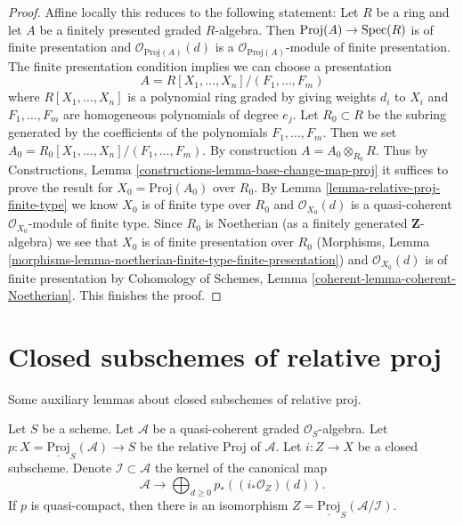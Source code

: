 \begin{proof}
Affine locally this reduces to the following statement:
Let $R$ be a ring and let $A$ be a finitely presented graded $R$-algebra.
Then $\text{Proj}(A) \to \mathop{\mathrm{Spec}}(R)$ is of finite presentation
and $\mathcal{O}_{\text{Proj}(A)}(d)$ is a
$\mathcal{O}_{\text{Proj}(A)}$-module of finite presentation.
The finite presentation condition implies we can choose
a presentation
$$
A = R[X_1, \ldots, X_n]/(F_1, \ldots, F_m)
$$
where $R[X_1, \ldots, X_n]$ is a polynomial ring graded by giving
weights $d_i$ to $X_i$ and $F_1, \ldots, F_m$ are homogeneous polynomials
of degree $e_j$. Let $R_0 \subset R$ be the subring generated by
the coefficients of the polynomials $F_1, \ldots, F_m$.
Then we set $A_0 = R_0[X_1, \ldots, X_n]/(F_1, \ldots, F_m)$.
By construction $A = A_0 \otimes_{R_0} R$.
Thus by
Constructions, Lemma \ref{constructions-lemma-base-change-map-proj}
it suffices to prove the result for $X_0 = \text{Proj}(A_0)$ over $R_0$.
By Lemma \ref{lemma-relative-proj-finite-type}
we know $X_0$ is of finite type over $R_0$ and
$\mathcal{O}_{X_0}(d)$ is a quasi-coherent $\mathcal{O}_{X_0}$-module
of finite type.
Since $R_0$ is Noetherian (as a finitely generated $\mathbf{Z}$-algebra)
we see that $X_0$ is of finite presentation over $R_0$
(Morphisms, Lemma
\ref{morphisms-lemma-noetherian-finite-type-finite-presentation})
and $\mathcal{O}_{X_0}(d)$ is of finite presentation by
Cohomology of Schemes, Lemma \ref{coherent-lemma-coherent-Noetherian}.
This finishes the proof.
\end{proof}










\section{Closed subschemes of relative proj}
\label{section-closed-in-relative-proj}

\noindent
Some auxiliary lemmas about closed subschemes of relative proj.

\begin{lemma}
\label{lemma-closed-subscheme-proj}
Let $S$ be a scheme. Let $\mathcal{A}$ be a quasi-coherent graded
$\mathcal{O}_S$-algebra. Let
$p : X = \underline{\text{Proj}}_S(\mathcal{A}) \to S$ be the relative
Proj of $\mathcal{A}$. Let $i : Z \to X$ be a closed subscheme. Denote
$\mathcal{I} \subset \mathcal{A}$ the kernel of the canonical map
$$
\mathcal{A}
\longrightarrow
\bigoplus\nolimits_{d \geq 0} p_*\left((i_*\mathcal{O}_Z)(d)\right).
$$
If $p$ is quasi-compact, then there is an isomorphism
$Z = \underline{\text{Proj}}_S(\mathcal{A}/\mathcal{I})$.
\end{lemma}

